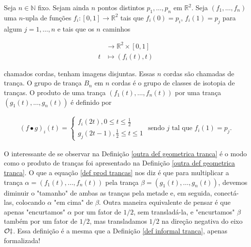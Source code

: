 	\begin{deff}
		\label{outra def geometrica tranca}
		Seja $n\in\mathbb{N}$ fixo. Sejam ainda $n$ pontos distintos $p_1, \dots, p_n$ em $\mathbb{R}^2$. Seja $(f_1, \dots, f_n)$ uma $n$-upla de funções $f_i:[0,1]\to\mathbb{R}^2$ tais que $f_i(0) = p_i$, $f_i(1) = p_j$ para algum $j=1,\dots,n$ e tais que os $n$ caminhos 
		
		\begin{align*}
		[0,1]&\to\mathbb{R}^2\times[0,1] \\
		t&\mapsto (f_i(t), t)
		\end{align*}
		
		\par\vspace{0.3cm} chamados cordas, tenham imagens disjuntas. Essas $n$ cordas são chamadas de trança. O grupo de trança $B_n$ em $n$ cordas é o grupo de classes de isotopia de tranças. O produto de uma trança $( f_1(t), \dots, f_n(t) )$ por uma trança $( g_1(t), \dots, g_n(t) )$ é definido por
		
		\begin{align}
		\label{def prod trancas}
		(f\bullet g)_i(t) = \begin{cases}
		f_i(2t), 0\leq t\leq \displaystyle{\frac{1}{2}} \\
		g_j(2t-1), \displaystyle{\frac{1}{2}}\leq t\leq 1
		\end{cases}\text{ sendo } j \text{ tal que }f_i(1) = p_j.
		\end{align}
		
	\end{deff}
	
	\par\vspace{0.3cm} O interessante de se observar na Definição \eqref{outra def geometrica tranca} é o modo como o produto de tranças foi apresentado na Definição \eqref{outra def geometrica tranca}. O que a equação \eqref{def prod trancas} nos diz é que para multiplicar a trança $\alpha = ( f_1(t), \dots, f_n(t) )$ pela trança $\beta = ( g_1(t), \dots, g_n(t) )$, devemos diminuir o "tamanho" de ambas as tranças pela metade e, em seguida, conectá-las, colocando $\alpha$ "em cima" de $\beta$. Outra maneira equivalente de pensar é que apenas "encurtamos" $\alpha$ por um fator de $1/2$, sem transladá-la, e "encurtamos" $\beta$ também por um fator de $1/2$, mas transladamos $1/2$ na direção negativa do eixo $\cal{O}z$. Essa definição é a mesma que a Definição \eqref{def informal tranca}, apenas formalizada!